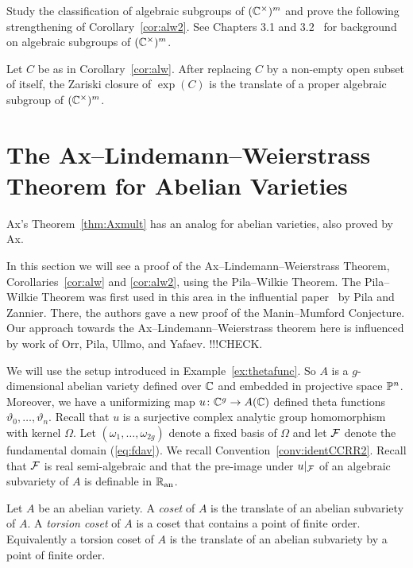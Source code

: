 \begin{exercise}
  Study the classification of algebraic subgroups of $({\mathbb{C}}^\times)^m$
  and prove the following strengthening of Corollary~\ref{cor:alw2}.
  See Chapters 3.1 and 3.2~\cite{BG} for background on algebraic
  subgroups of $({\mathbb{C}}^\times)^m$. 
\end{exercise}
\begin{corollary}
  \label{cor:alw2}
  Let $C$ be as in Corollary~\ref{cor:alw}. After replacing $C$ by a
  non-empty open subset of itself, the Zariski closure of $\exp(C)$ is
  the translate of a proper algebraic subgroup of $({\mathbb{C}}^\times)^m$. 
\end{corollary}

\section{The Ax--Lindemann--Weierstrass Theorem for Abelian Varieties}

Ax's Theorem~\ref{thm:Axmult} has an analog for abelian varieties,
also proved by Ax.

In this section we will see a proof of the Ax--Lindemann--Weierstrass
Theorem, Corollaries~\ref{cor:alw} and \ref{cor:alw2}, using the
Pila--Wilkie Theorem. The Pila--Wilkie Theorem was first used in this
area in the influential paper~\cite{PilaZannier} by Pila and Zannier.
There, the authors gave a new proof of the Manin--Mumford Conjecture.
Our approach towards the Ax--Lindemann--Weierstrass theorem here is
influenced by work of Orr, Pila, Ullmo, and Yafaev. !!!CHECK.

We will use the setup introduced in Example~\ref{ex:thetafunc}. So $A$
is a $g$-dimensional abelian variety defined over ${\mathbb{C}}$ and embedded
in projective space ${\mathbb{P}}^n$. Moreover, we have a uniformizing map
$u\colon {\mathbb{C}}^g\rightarrow A({\mathbb{C}})$ defined theta functions
$\vartheta_0,\ldots,\vartheta_n$. Recall that $u$ is a surjective
complex analytic group homomorphism with kernel $\Omega$. Let
$(\omega_1,\ldots,\omega_{2g})$ denote a fixed basis of $\Omega$ and
let ${\mathcal F}$ denote the fundamental domain (\ref{eq:fdav}).
We recall Convention~\ref{conv:identCCRR2}. 
Recall that ${\mathcal F}$ is real semi-algebraic and that the pre-image under
$u|_{{\mathcal F}}$ of an algebraic subvariety of $A$ is definable in ${{\mathbb{R}}_{\mathrm{an}}}$.


\begin{definition}
  Let $A$ be an abelian variety. A \emph{coset} of $A$ is the translate of an
  abelian subvariety of $A$. A \emph{torsion coset} of $A$ is a coset
  that contains a point of finite order. Equivalently a torsion coset
  of $A$ is the translate of an abelian subvariety by a point of
  finite order. 
\end{definition}


